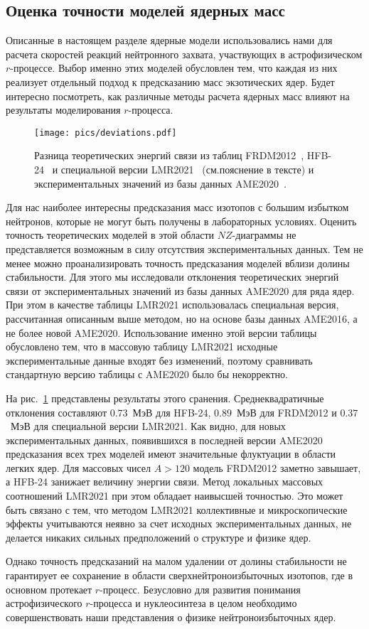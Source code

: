 \subsection{Оценка точности моделей ядерных масс}
Описанные в настоящем разделе ядерные модели использовались нами для расчета скоростей реакций нейтронного захвата, участвующих в астрофизическом $r$-процессе. Выбор именно этих моделей обусловлен тем, что каждая из них реализует отдельный подход к предсказанию масс экзотических ядер. Будет интересно посмотреть, как различные методы расчета ядерных масс влияют на результаты моделирования $r$-процесса.

\begin{figure}
  \centering
  \texttt{[image: pics/deviations.pdf]}
  \caption{Разница теоретических энергий связи из таблиц FRDM2012~\cite{moller2016}, HFB-24~\cite{goriely2013} и специальной версии LMR2021~\cite{vladimirova2022} (см.пояснение в тексте) и экспериментальных значений из базы данных AME2020~\cite{huang2021}.}
  \label{fig:deviations}
\end{figure}

Для нас наиболее интересны предсказания масс изотопов с большим избытком нейтронов, которые не могут быть получены в лабораторных условиях. Оценить точность теоретических моделей в этой области $NZ$-диаграммы не представляется возможным в силу отсутствия экспериментальных данных. Тем не менее можно проанализировать точность предсказания моделей вблизи долины стабильности. Для этого мы исследовали отклонения теоретических энергий связи от экспериментальных значений из базы данных AME2020 для ряда ядер. При этом в качестве таблицы LMR2021 использовалась специальная версия, рассчитанная описанным выше методом, но на основе базы данных AME2016, а не более новой AME2020. Использование именно этой версии таблицы обусловлено тем, что в массовую таблицу LMR2021 исходные экспериментальные данные входят без изменений, поэтому сравнивать стандартную версию таблицы с AME2020 было бы некорректно.

На рис.~\ref{fig:deviations} представлены результаты этого сранения. Среднеквадратичные отклонения составляют $0.73$~МэВ для HFB-24, $0.89$~МэВ для FRDM2012 и $0.37$~МэВ для специальной версии LMR2021. Как видно, для новых экспериментальных данных, появившихся в последней версии AME2020
предсказания всех трех моделей имеют значительные флуктуации в области легких ядер. Для массовых чисел $A > 120$ модель FRDM2012 заметно завышает, а HFB-24 занижает величину энергии связи. Метод локальных массовых соотношений LMR2021 при этом обладает наивысшей точностью. Это может быть связано с тем, что методом LMR2021 коллективные и микроскопические эффекты учитываются неявно за счет исходных экспериментальных данных, не делается никаких сильных предположений о структуре и физике ядер. 

Однако точность предсказаний на малом удалении от долины стабильности не гарантирует ее сохранение в области сверхнейтроноизбыточных изотопов, где в основном протекает $r$-процесс. Безусловно для развития понимания астрофизического $r$-процесса и нуклеосинтеза в целом необходимо совершенствовать наши представления о физике нейтроноизбыточных ядер.

